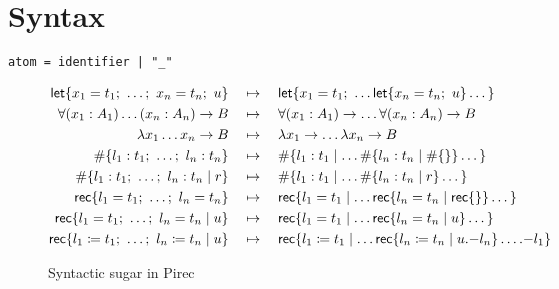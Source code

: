\section{Syntax}

\begin{verbatim}
atom = identifier | "_"
\end{verbatim}

\begin{figure}
  \begin{align*}
    \operatorname{\mathsf{let}} \{ x_1 = t_1;\ \dots;\ x_n = t_n;\ u \}
     & \quad\mapsto\quad
    \operatorname{\mathsf{let}} \{ x_1 = t_1;\ \dots \operatorname{\mathsf{let}} \{ x_n = t_n;\ u \} \dots \}
    \\
    \forall (x_1 : A_1) \dots (x_n : A_n) \to B
     & \quad\mapsto\quad
    \forall (x_1 : A_1) \to \dots \forall (x_n : A_n) \to B
    \\
    \lambda x_1 \dots x_n \to B
     & \quad\mapsto\quad
    \lambda x_1 \to \dots \lambda x_n \to B
    \\
    \# \{ l_1 : t_1;\ \dots;\ l_n : t_n \}
     & \quad\mapsto\quad
    \# \{ l_1 : t_1 \mid \dots \# \{ l_n : t_n \mid \# \{ \} \} \dots \}
    \\
    \# \{ l_1 : t_1;\ \dots;\ l_n : t_n \mid r \}
     & \quad\mapsto\quad
    \# \{ l_1 : t_1 \mid \dots \# \{ l_n : t_n \mid r \} \dots \}
    \\
    \operatorname{\mathsf{rec}} \{ l_1 = t_1;\ \dots;\ l_n = t_n \}
     & \quad\mapsto\quad
    \operatorname{\mathsf{rec}} \{ l_1 = t_1 \mid \dots
    \operatorname{\mathsf{rec}} \{ l_n = t_n \mid \operatorname{\mathsf{rec}} \{ \} \} \dots \}
    \\
    \operatorname{\mathsf{rec}} \{ l_1 = t_1;\ \dots;\ l_n = t_n \mid u \}
     & \quad\mapsto\quad
    \operatorname{\mathsf{rec}} \{ l_1 = t_1 \mid \dots
    \operatorname{\mathsf{rec}} \{ l_n = t_n \mid u \} \dots \}
    \\
    \operatorname{\mathsf{rec}} \{ l_1 \coloneqq t_1;\ \dots;\ l_n \coloneqq t_n \mid u \}
     & \quad\mapsto\quad
    \operatorname{\mathsf{rec}} \{ l_1 \coloneqq t_1 \mid \dots
    \operatorname{\mathsf{rec}} \{ l_n \coloneqq t_n \mid u \mathord{.-} l_n \}
    \dots \mathord{.-} l_1 \}
  \end{align*}
  \caption{Syntactic sugar in Pirec}\label{fig:sugar}
\end{figure}

